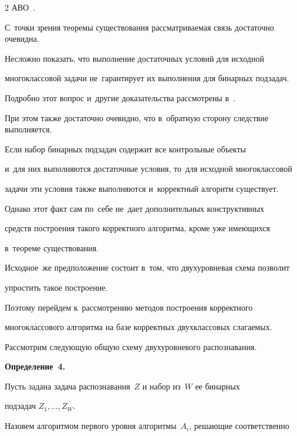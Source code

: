 \begin{multicols}{2}
АВО~\cite{dokukin2001}.


С~точки зрения теоремы существования рассматриваемая связь достаточно очевидна.


Несложно показать, что выполнение достаточных условий для исходной 


многоклассовой задачи не~гарантирует их выполнения для бинарных подзадач.


Подробно этот вопрос и~другие доказательства рассмотрены в~\cite{patrec}.





При этом также достаточно очевидно, что в~обратную сторону следствие выполняется.


Если набор бинарных подзадач содержит все контрольные объекты 


и~для них выполняются достаточные условия, то~для исходной многоклассовой 


задачи эти условия также выполняются и~корректный алгоритм существует.


Однако этот факт сам по~себе не~дает дополнительных конструктивных 


средств построения такого корректного алгоритма, кроме уже имеющихся 


в~теореме существования.


Исходное~же предположение состоит в~том, что двухуровневая схема позволит 


упростить такое построение.


Поэтому перейдем к~рассмотрению методов построения корректного 


многоклассового алгоритма на базе корректных двухклассовых слагаемых.





Рассмотрим следующую общую схему двухуровневого распознавания.








\smallskip





\noindent


\textbf{Определение~4.}\


Пусть задана задача распознавания~$Z$ и набор из~$W$ ее бинарных 


подзадач $Z_1,\ldots,Z_W$.


Назовем алгоритмом первого уровня алгоритмы~$A_i$, решающие соответственно 



\end{multicols}
